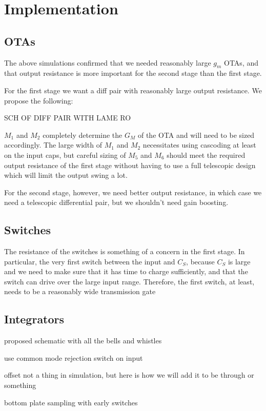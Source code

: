 \documentclass[conference]{IEEEtran}
\begin{document}
\section{Implementation}

\subsection{OTAs}
The above simulations confirmed that we needed reasonably large $g_m$ OTAs, and that output resistance is more important for the second stage than the first stage.

For the first stage we want a diff pair with reasonably large output resistance. We propose the following:

SCH OF DIFF PAIR WITH LAME RO

$M_1$ and $M_2$ completely determine the $G_M$ of the OTA and will need to be sized accordingly. The large width of $M_1$ and $M_2$ necessitates using cascoding at least on the input caps, but careful sizing of $M_5$ and $M_6$ should meet the required output resistance of the first stage without having to use a full telescopic design which will limit the output swing a lot.

For the second stage, however, we need better output resistance, in which case we need a telescopic differential pair, but we shouldn't need gain boosting.

\subsection{Switches}
The resistance of the switches is something of a concern in the first stage. In particular, the very first switch between the input and $C_S$, because $C_S$ is large and we need to make sure that it has time to charge sufficiently, and that the switch can drive over the large input range. Therefore, the first switch, at least, needs to be a reasonably wide transmission gate

\subsection{Integrators}

proposed schematic with all the bells and whistles

use common mode rejection switch on input

offset not a thing in simulation, but here is how we will add it to be through or something

bottom plate sampling with early switches
\end{document}
